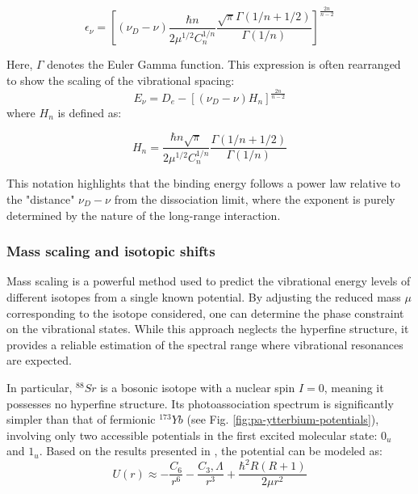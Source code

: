 \begin{equation}
    \epsilon_{\nu} = \left[ (\nu_D - \nu) \frac{\hbar n}{2\mu^{1/2} C_n^{1/n}} \frac{\sqrt{\pi} 
    \Gamma(1/n + 1/2)}{\Gamma(1/n)} \right]^{\frac{2n}{n-2}}
\end{equation}

Here, $\Gamma$ denotes the Euler Gamma function. This expression is often rearranged to show the 
scaling of the vibrational spacing:
\begin{equation}
    E_{\nu} = D_e - \left[ (\nu_D - \nu) H_n \right]^{\frac{2n}{n-2}}
\end{equation}
\label{leroy-bernstein}
where $H_n$ is defined as:

\begin{equation}
    H_n = \frac{\hbar n \sqrt{\pi}}{2\mu^{1/2} C_n^{1/n}} \frac{\Gamma(1/n + 1/2)}{\Gamma(1/n)}
\end{equation}

This notation highlights that the binding energy follows a power law relative to the "distance" $\nu_D - \nu$
from the dissociation limit, where the exponent is purely determined by the nature of the long-range 
interaction.

\subsubsection{Mass scaling and isotopic shifts}

Mass scaling is a powerful method used to predict the vibrational energy levels of different isotopes 
from a single known potential. By adjusting the reduced mass $\mu$ corresponding to the isotope considered, 
one can determine the phase constraint on the vibrational states. While this approach neglects the hyperfine 
structure, it provides a reliable estimation of the spectral range where vibrational resonances are expected.

In particular, $^{88}Sr$ is a bosonic isotope with a nuclear spin $I=0$, meaning it possesses no hyperfine 
structure. Its photoassociation spectrum is significantly simpler than that of fermionic $^{173}Yb$ (see Fig. 
\ref{fig:pa-ytterbium-potentials}), involving only two accessible potentials in the first excited molecular 
state: $0_u$ and $1_u$. Based on the results presented in \cite{zelevinsky_narrow_2006}, the potential can be 
modeled as:
\begin{equation}
    U(r) \approx -\frac{C_{6}}{r^6} -\frac{C_3, \Lambda}{r^3} + \frac{\hbar^2 R(R+1)}{2\mu r^2}
\end{equation}

